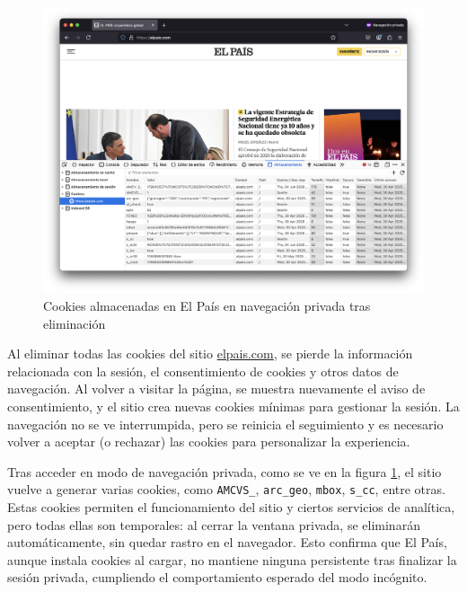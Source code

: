 \begin{figure}[H]   
    \centering
    \includegraphics[width=\textwidth]{cookies_pais_npriv.png}
    \caption{Cookies almacenadas en El País en navegación privada tras eliminación}
    \label{fig:cookies_pais_npriv}
\end{figure}

Al eliminar todas las cookies del sitio \url{elpais.com}, se pierde la información relacionada con la sesión, el consentimiento de cookies y otros datos de navegación. Al volver a visitar la página, se muestra nuevamente el aviso de consentimiento, y el sitio crea nuevas cookies mínimas para gestionar la sesión. La navegación no se ve interrumpida, pero se reinicia el seguimiento y es necesario volver a aceptar (o rechazar) las cookies para personalizar la experiencia.

Tras acceder en modo de navegación privada, como se ve en la figura \ref{fig:cookies_pais_npriv}, el sitio vuelve a generar varias cookies, como \texttt{AMCVS\_}, \texttt{arc\_geo}, \texttt{mbox}, \texttt{s\_cc}, entre otras. Estas cookies permiten el funcionamiento del sitio y ciertos servicios de analítica, pero todas ellas son temporales: al cerrar la ventana privada, se eliminarán automáticamente, sin quedar rastro en el navegador. Esto confirma que El País, aunque instala cookies al cargar, no mantiene ninguna persistente tras finalizar la sesión privada, cumpliendo el comportamiento esperado del modo incógnito.
